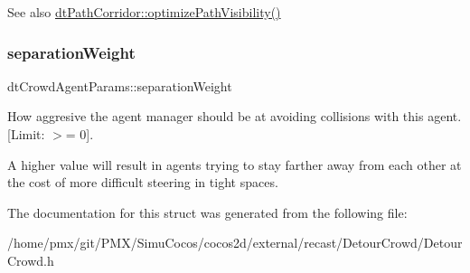\begin{DoxySeeAlso}{See also}
\hyperlink{classdtPathCorridor_a3970b6cd229731debe6beb41d9885463}{dt\+Path\+Corridor\+::optimize\+Path\+Visibility()} 
\end{DoxySeeAlso}
\mbox{\label{structdtCrowdAgentParams_a616534204934492b4f3bc7eb2ff49a0b}} 
\subsubsection{\texorpdfstring{separation\+Weight}{separationWeight}}
{\footnotesize\ttfamily dt\+Crowd\+Agent\+Params\+::separation\+Weight}



How aggresive the agent manager should be at avoiding collisions with this agent. \mbox{[}Limit\+: $>$= 0\mbox{]}. 

\begin{DoxyParagraph}{}

\end{DoxyParagraph}
A higher value will result in agents trying to stay farther away from each other at the cost of more difficult steering in tight spaces. 

The documentation for this struct was generated from the following file\+:\begin{DoxyCompactItemize}
\item 
/home/pmx/git/\+P\+M\+X/\+Simu\+Cocos/cocos2d/external/recast/\+Detour\+Crowd/Detour\+Crowd.\+h\end{DoxyCompactItemize}
